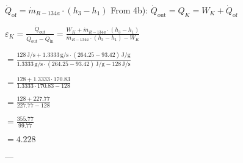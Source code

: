\( \dot{Q}_{\text{of}} = \dot{m}_{R-134a} \cdot (h_3 - h_1) \)  
From 4b):  
\( \dot{Q}_{\text{out}} = Q_K = W_K + \dot{Q}_{\text{of}} \)  

\( \varepsilon_K = \frac{\dot{Q}_{\text{out}}}{\dot{Q}_{\text{out}} - \dot{Q}_{\text{in}}} = \frac{W_K + \dot{m}_{R-134a} \cdot (h_3 - h_1)}{\dot{m}_{R-134a} \cdot (h_3 - h_1) - W_K} \)  

\( = \frac{128 \, \text{J/s} + 1.3333 \, \text{g/s} \cdot (264.25 - 93.42) \, \text{J/g}}{1.3333 \, \text{g/s} \cdot (264.25 - 93.42) \, \text{J/g} - 128 \, \text{J/s}} \)  

\( = \frac{128 + 1.3333 \cdot 170.83}{1.3333 \cdot 170.83 - 128} \)  

\( = \frac{128 + 227.77}{227.77 - 128} \)  

\( = \frac{355.77}{99.77} \)  

\( = 4.228 \)  

---